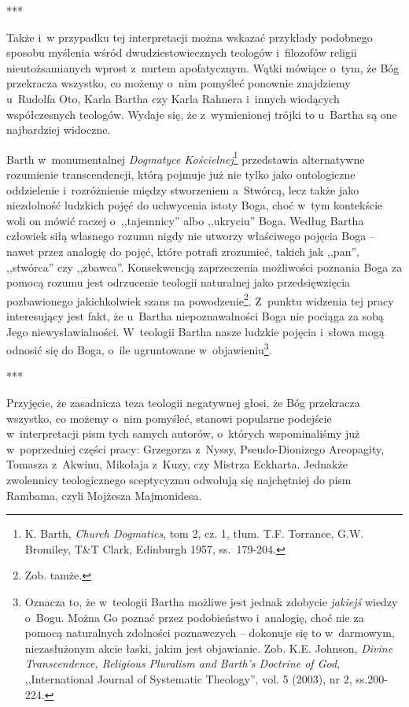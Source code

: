 ***

Także i~w przypadku tej interpretacji można wskazać przykłady podobnego sposobu myślenia wśród dwudziestowiecznych teologów i~filozofów religii nieutożsamianych wprost z~nurtem apofatycznym. Wątki mówiące o~tym, że Bóg przekracza wszystko, co możemy o~nim pomyśleć ponownie znajdziemy u~Rudolfa Oto, Karla Bartha czy Karla Rahnera i~innych wiodących współczesnych teologów. Wydaje się, że z~wymienionej trójki to u~Bartha są one najbardziej widoczne.

Barth w~monumentalnej \textit{Dogmatyce Kościelnej}\footnote{K. Barth, \textit{Church Dogmatics}, tom 2, cz. 1, tłum. T.F. Torrance, G.W. Bromiley, T\&T Clark, Edinburgh 1957, ss.~179-204.} przedstawia alternatywne rozumienie transcendencji, którą pojmuje już nie tylko jako ontologiczne oddzielenie i~rozróżnienie między stworzeniem a~Stwórcą, lecz także jako niezdolność ludzkich pojęć do uchwycenia istoty Boga, choć w~tym kontekście woli on mówić raczej o~,,tajemnicy'' albo ,,ukryciu'' Boga. Według Bartha człowiek siłą własnego rozumu nigdy nie utworzy właściwego pojęcia Boga -- nawet przez analogię do pojęć, które potrafi zrozumieć, takich jak ,,pan'', ,,stwórca'' czy ,,zbawca''. Konsekwencją zaprzeczenia możliwości poznania Boga za pomocą rozumu jest odrzucenie teologii naturalnej jako przedsięwzięcia pozbawionego jakichkolwiek szans na powodzenie\footnote{Zob. tamże.}. Z~punktu widzenia tej pracy interesujący jest fakt, że u~Bartha niepoznawalności Boga nie pociąga za sobą Jego niewysławialności. W~teologii Bartha nasze ludzkie pojęcia i~słowa mogą odnosić się do Boga, o~ile ugruntowane w~objawieniu\footnote{Oznacza to, że w~teologii Bartha możliwe jest jednak zdobycie \textit{jakiejś} wiedzy o~Bogu. Można Go poznać przez podobieństwo i~analogię, choć nie za pomocą naturalnych zdolności poznawczych -- dokonuje się to w~darmowym, niezasłużonym akcie łaski, jakim jest objawianie. Zob. K.E. Johnson, \textit{Divine Transcendence, Religious Pluralism and Barth's Doctrine of God}, ,,International Journal of Systematic Theology'', vol. 5 (2003), nr 2, ss.200-224.}.

***

Przyjęcie, że zasadnicza teza teologii negatywnej głosi, że Bóg przekracza wszystko, co możemy o~nim pomyśleć, stanowi popularne podejście w~interpretacji pism tych samych autorów, o~których wspominaliśmy już w~poprzedniej części pracy: Grzegorza z~Nyssy, Pseudo-Dionizego Areopagity, Tomasza z~Akwinu, Mikołaja z~Kuzy, czy Mistrza Eckharta. Jednakże zwolennicy teologicznego sceptycyzmu odwołują się najchętniej do pism Rambama, czyli Mojżesza Majmonidesa.

